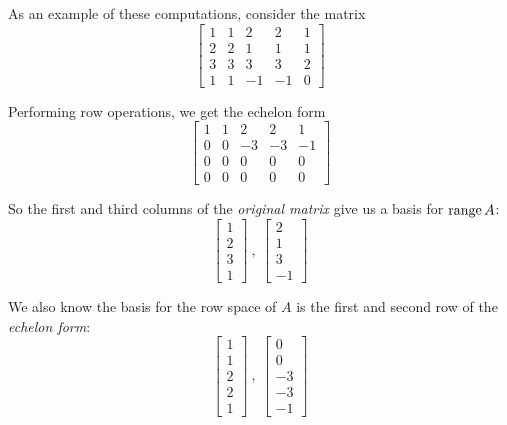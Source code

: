 As an example of these computations, consider the matrix 
$$\begin{bmatrix}
1 & 1 & 2 & 2 & 1 \\
2 & 2 & 1 & 1 & 1 \\
3 & 3 & 3 & 3 & 2 \\
1 & 1 & -1 & -1 & 0
\end{bmatrix}$$

Performing row operations, we get the echelon form 
$$\begin{bmatrix}
1 & 1 & 2 & 2 & 1 \\
0 & 0 & -3 & -3 & -1 \\
0 & 0 & 0 & 0 & 0 \\
0 & 0 & 0 & 0 & 0
\end{bmatrix}$$

So the first and third columns of the \textit{original matrix} give us a basis for $\operatorname{range} A$: 
$$\begin{bmatrix}
1 \\ 
2 \\
3 \\ 
1
\end{bmatrix}\ ,\  \begin{bmatrix}
2 \\ 
1 \\
3 \\
-1
\end{bmatrix}$$

We also know the basis for the row space of $A$ is the first and second row of the \textit{echelon form}:
$$\begin{bmatrix}
1 \\
1 \\
2 \\
2 \\
1
\end{bmatrix} \ , \ \begin{bmatrix}
0 \\
0 \\ 
-3 \\ 
-3 \\ 
-1
\end{bmatrix}$$

